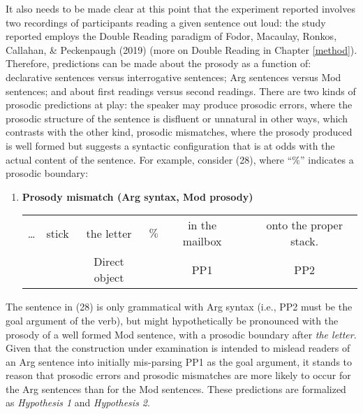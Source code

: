 \documentclass[11pt,oneside]{book}
\providecommand{\tightlist}{%
  \setlength{\itemsep}{0pt}\setlength{\parskip}{0pt}}
\begin{document}
\doublespacing

It also needs to be made clear at this point that the experiment reported involves two recordings of participants reading a given sentence out loud: the study reported employs the Double Reading paradigm of Fodor, Macaulay, Ronkos, Callahan, \& Peckenpaugh (2019) (more on Double Reading in Chapter \ref{method}). Therefore, predictions can be made about the prosody as a function of: declarative sentences versus interrogative sentences; Arg sentences versus Mod sentences; and about first readings versus second readings. There are two kinds of prosodic predictions at play: the speaker may produce prosodic errors, where the prosodic structure of the sentence is disfluent or unnatural in other ways, which contrasts with the other kind, prosodic mismatches, where the prosody produced is well formed but suggests a syntactic configuration that is at odds with the actual content of the sentence. For example, consider (28), where ``\(\%\)'' indicates a prosodic boundary:

\singlespacing

\begin{enumerate}
\def\labelenumi{(\arabic{enumi})}
\setcounter{enumi}{27}
\tightlist
\item
  \textbf{Prosody mismatch (Arg syntax, Mod prosody)}
  \begingroup
  \setlength{\tabcolsep}{2pt}

  \begin{tabular}{ccccccc}
    \dots & stick & the letter & $\%$ & in the mailbox & & onto the proper stack. \\
    & & \footnotesize Direct object & & \footnotesize PP1 & & \footnotesize PP2 \\
  \end{tabular}
    \endgroup
\end{enumerate}

\doublespacing

The sentence in (28) is only grammatical with Arg syntax (i.e., PP2 must be the goal argument of the verb), but might hypothetically be pronounced with the prosody of a well formed Mod sentence, with a prosodic boundary after \emph{the letter}. Given that the construction under examination is intended to mislead readers of an Arg sentence into initially mis-parsing PP1 as the goal argument, it stands to reason that prosodic errors and prosodic mismatches are more likely to occur for the Arg sentences than for the Mod sentences. These predictions are formalized as \emph{Hypothesis 1} and \emph{Hypothesis 2}.
\end{document}
